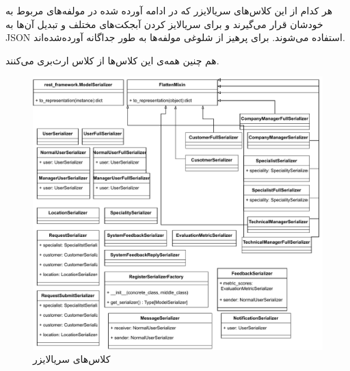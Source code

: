 \recalctypearea

هر کدام از این کلاس‌های سریالایزر که در ادامه آورده شده در مولفه‌های مربوط به خودشان قرار می‌گیرند و برای سریالایز کردن آبجکت‌های مختلف و تبدیل آن‌ها به JSON استفاده می‌شوند. برای پرهیز از شلوغی مولفه‌ها به طور جداگانه آورده‌شده‌اند.

هم چنین همه‌ی این کلاس‌ها از کلاس
ارث‌بری می‌کنند.

\begin{figure}[ht!]
	\centering
	\includegraphics[scale=0.8]{figs/design-class/serial.pdf}
	\caption{کلاس‌های سریالایزر}
\end{figure}
\FloatBarrier
\newpage


\recalctypearea
\newpage

